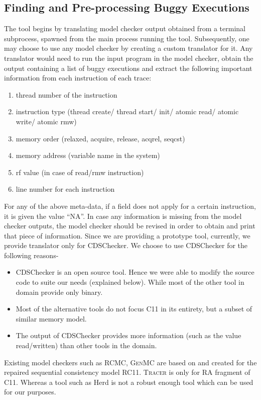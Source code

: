\subsection{Finding and Pre-processing Buggy Executions}
The tool begins by translating model checker output obtained from a 
terminal subprocess, spawned from the main process running the tool. 
Subsequently, one may choose to use any model checker by creating a 
custom translator for it. Any translator would need to run the input program in the model checker, 
obtain the output containing a list of buggy executions and 
extract the following important information from each instruction 
of each trace:
%
\begin{enumerate}
	\item thread number of the instruction
	\item instruction type (thread create/ thread start/ init/ atomic read/ atomic write/ atomic rmw)
	\item memory order (relaxed, acquire, release, acq\textunderscore rel, seq\textunderscore cst)
	\item memory address (variable name in the system)
	\item rf value (in case of read/rmw instruction)
	\item line number for each instruction
\end{enumerate}
For any of the above meta-data, if a field does not apply for a certain instruction, 
it is given the value ``NA''. In case any information is missing from 
the model checker outputs, the model checker should be revised in order 
to obtain and print that piece of information. 
%
Since we are providing a prototype tool, 
currently, we provide translator only for CDSChecker. 
We choose to use CDSChecker for the following reasons- 
\begin{itemize}
	\item CDSChecker is an open source tool. Hence we were able 
	to modify the source code to suite our needs (explained below). 
	While most of the other tool in domain provide 
	only binary.
	
	\item Most of the alternative tools do not focus C11 in its entirety, 
	but a subset of similar memory model.
	
	\item The output of CDSChecker provides more information 
	(such as the value read/written) than other tools in the domain.
\end{itemize}
Existing model checkers such as \textsc{RCMC}\cite{rcmc-POPL18},  
\textsc{GenMC}\cite{genmc-OOPSLA19,genmc-PLDI19} are based on and created for the 
repaired sequential consistency model RC11\cite{LahavVafeiadis-PLDI17}.
\textsc{Tracer}\cite{tracer2018} is only for RA fragment of C11.
Whereas a tool such as Herd\cite{herd} is not a 
robust enough tool which can be used for our purposes. 

